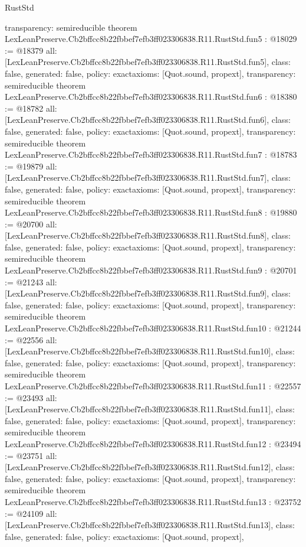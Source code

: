 \begin{lexlean}{RustStd}
\begin{coremodule}
{  transparency: semireducible
}
theorem LexLeanPreserve.Cb2bffcc8b22fbbef7efb3ff023306838.R11.RustStd.fun5 : @18029 := @18379 {
  all: [LexLeanPreserve.Cb2bffcc8b22fbbef7efb3ff023306838.R11.RustStd.fun5],
  class: false,
  generated: false,
  policy: exact{axioms: [Quot.sound, propext]},
  transparency: semireducible
}
theorem LexLeanPreserve.Cb2bffcc8b22fbbef7efb3ff023306838.R11.RustStd.fun6 : @18380 := @18782 {
  all: [LexLeanPreserve.Cb2bffcc8b22fbbef7efb3ff023306838.R11.RustStd.fun6],
  class: false,
  generated: false,
  policy: exact{axioms: [Quot.sound, propext]},
  transparency: semireducible
}
theorem LexLeanPreserve.Cb2bffcc8b22fbbef7efb3ff023306838.R11.RustStd.fun7 : @18783 := @19879 {
  all: [LexLeanPreserve.Cb2bffcc8b22fbbef7efb3ff023306838.R11.RustStd.fun7],
  class: false,
  generated: false,
  policy: exact{axioms: [Quot.sound, propext]},
  transparency: semireducible
}
theorem LexLeanPreserve.Cb2bffcc8b22fbbef7efb3ff023306838.R11.RustStd.fun8 : @19880 := @20700 {
  all: [LexLeanPreserve.Cb2bffcc8b22fbbef7efb3ff023306838.R11.RustStd.fun8],
  class: false,
  generated: false,
  policy: exact{axioms: [Quot.sound, propext]},
  transparency: semireducible
}
theorem LexLeanPreserve.Cb2bffcc8b22fbbef7efb3ff023306838.R11.RustStd.fun9 : @20701 := @21243 {
  all: [LexLeanPreserve.Cb2bffcc8b22fbbef7efb3ff023306838.R11.RustStd.fun9],
  class: false,
  generated: false,
  policy: exact{axioms: [Quot.sound, propext]},
  transparency: semireducible
}
theorem LexLeanPreserve.Cb2bffcc8b22fbbef7efb3ff023306838.R11.RustStd.fun10 : @21244 := @22556 {
  all: [LexLeanPreserve.Cb2bffcc8b22fbbef7efb3ff023306838.R11.RustStd.fun10],
  class: false,
  generated: false,
  policy: exact{axioms: [Quot.sound, propext]},
  transparency: semireducible
}
theorem LexLeanPreserve.Cb2bffcc8b22fbbef7efb3ff023306838.R11.RustStd.fun11 : @22557 := @23493 {
  all: [LexLeanPreserve.Cb2bffcc8b22fbbef7efb3ff023306838.R11.RustStd.fun11],
  class: false,
  generated: false,
  policy: exact{axioms: [Quot.sound, propext]},
  transparency: semireducible
}
theorem LexLeanPreserve.Cb2bffcc8b22fbbef7efb3ff023306838.R11.RustStd.fun12 : @23494 := @23751 {
  all: [LexLeanPreserve.Cb2bffcc8b22fbbef7efb3ff023306838.R11.RustStd.fun12],
  class: false,
  generated: false,
  policy: exact{axioms: [Quot.sound, propext]},
  transparency: semireducible
}
theorem LexLeanPreserve.Cb2bffcc8b22fbbef7efb3ff023306838.R11.RustStd.fun13 : @23752 := @24109 {
  all: [LexLeanPreserve.Cb2bffcc8b22fbbef7efb3ff023306838.R11.RustStd.fun13],
  class: false,
  generated: false,
  policy: exact{axioms: [Quot.sound, propext]},
}
\end{coremodule}
\end{lexlean}
